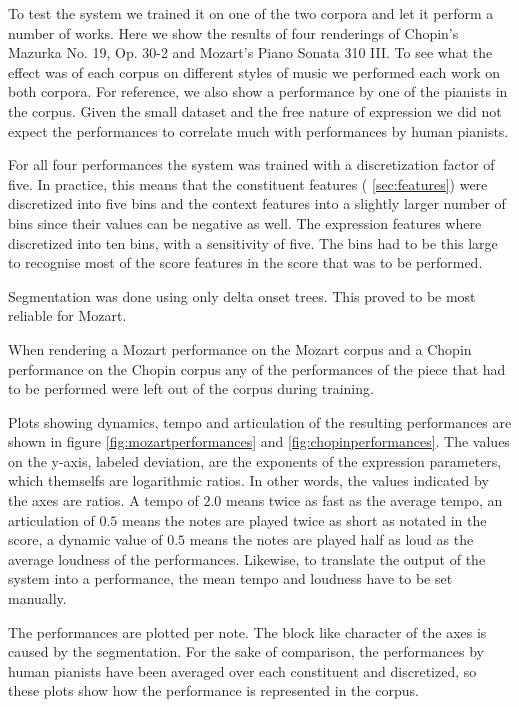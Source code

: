 \documentclass[a4paper,10pt]{article}
\begin{document}
To test the system we trained it on one of the two corpora and let it perform a number of works. Here we show the results of four renderings of Chopin's Mazurka No. 19, Op. 30-2 and Mozart's Piano Sonata 310 III. To see what the effect was of each corpus on different styles of music we performed each work on both corpora. For reference, we also show a performance by one of the pianists in the corpus. Given the small dataset and the free nature of expression we did not expect the performances to correlate much with performances by human pianists. 

For all four performances the system was trained with a discretization factor of five. In practice, this means that the constituent features (
\ref{sec:features}) were discretized into five bins and the context features into a slightly larger number of bins since their values can be negative as well. The expression features where discretized into ten bins, with a sensitivity of five. The bins had to be this large to recognise most of the score features in the score that was to be performed. 

Segmentation was done using only delta onset trees. This proved to be most reliable for Mozart. 

When rendering a Mozart performance on the Mozart corpus and a Chopin performance on the Chopin corpus any of the performances of the piece that had to be performed were left out of the corpus during training. 

Plots showing dynamics, tempo and articulation of the resulting performances are shown in figure \ref{fig:mozartperformances} and \ref{fig:chopinperformances}. The values on the y-axis, labeled deviation, are the exponents of the expression parameters, which themselfs are logarithmic ratios. In other words, the values indicated by the axes are ratios. A tempo of $2.0$ means twice as fast as the average tempo, an articulation of $0.5$ means the notes are played twice as short as notated in the score, a dynamic value of $0.5$ means the notes are played half as loud as the average loudness of the performances. Likewise, to translate the output of the system into a performance, the mean tempo and loudness have to be set manually. 

The performances are plotted per note. The block like character of the axes is caused by the segmentation. For the sake of comparison, the performances by human pianists have been averaged over each constituent and discretized, so these plots show how the performance is represented in the corpus.
\end{document}
